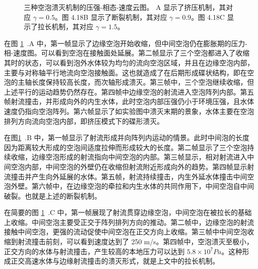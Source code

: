 \begin{figure}[H]
{    }
    \caption[三种空泡溃灭机制的压强-相态-速度云图。]{三种空泡溃灭机制的压强-相态-速度云图。
A 显示了挤压机制，其对应 $\gamma=0.5$。图 4.18B
显示了断裂机制，其对应 $\gamma=0.9$。图 4.18C 显示了拉长机制，其对应
$\gamma=1.5$。}
    \label{fig:4.18}
\end{figure}


 在图 \ref{fig:4.18}~.A
中，第一帧显示了边缘空泡开始收缩，但中间空泡仍在膨胀期的压力-相-速度图。可以看到空泡在接触面处延展。第二帧显示了三个空泡都进入了收缩其时的状态，可以看到泡外水体较为均匀的流向空泡区域，并且在边缘空泡内部，主要与对称轴平行地流向空泡接触面。这也就造成了在后期形成碟状结构，即在空泡的主轴长度保持较高长度，而次轴形成溃灭。第三帧中，三个空泡继续收缩，但上述平行的运动趋势仍然存在。第四帧中边缘空泡的射流进入空泡阵列内部。第五帧射流撞击，并形成向外的内生水体，此时空泡内部压强仍小于环境压强，且水体速度仍指向空泡阵列。第六帧显示了如实验图中溃灭末期的景象，水体主要在空泡排列方向流向空泡内部，即挤压模式下的碟形溃灭。

在图\ref{fig:4.18}~.B
中，第一帧显示了射流形成并向阵列内运动的情景。此时中间泡的长度因为距离较大形成的空泡间适度拉伸而形成较大的长度。第二帧显示了三个空泡持续收缩，边缘空泡形成的射流指向中间空泡的内部。第三帧显示，相对射流进入中间空泡内部，中间空泡的外壁仍在收缩但射流附近形成向外的趋势。第四帧显示射流撞击并产生向外延展的水体。第五帧，射流持续撞击，内生外延水体撞击中间空泡外壁。第六帧中，在边缘空泡的牵拉和内生水体的共同作用下，中间空泡自中间破裂。也就是上述的断裂机制。

在简要的图 \ref{fig:4.18}~.C
中，第一帧展现了射流贯穿边缘空泡，中间空泡在被拉长的基础上收缩。中间空泡主要受正交于阵列排列方向的推动。第二帧中，边缘空泡的射流接触中间空泡，更强的流动促使中间空泡在正交方向上收缩。第三帧中中间空泡收缩到射流撞击前刻，可以看到速度达到了
250
m/s。第四帧中，空泡溃灭至极小，正交方向的水体与射流撞击，产生较高的本地压力可以达到
$5.8\times 10^7 Pa$。这种形成正交高速水体与边缘射流撞击的溃灭形式，就是上文中的拉长机制。

